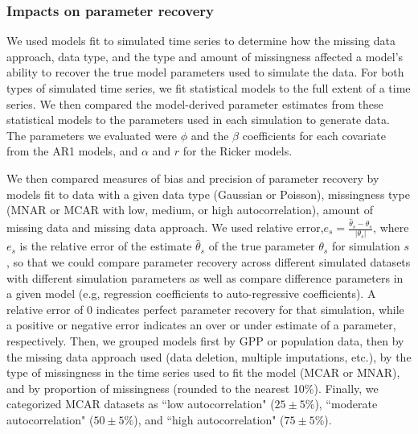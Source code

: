 \documentclass{article}
\begin{document}
\begin{linenumbers}
\subsubsection*{Impacts on parameter recovery}
We used models fit to simulated time series to determine how the missing data approach, data type, and the type and amount of missingness affected a model's ability to recover the true model parameters used to simulate the data. For both types of simulated time series, we fit statistical models to the full extent of a time series. We then compared the model-derived parameter estimates from these statistical models to the parameters used in each simulation to generate data. The parameters we evaluated were $\phi$ and the $\beta$ coefficients for each covariate from the AR1 models, and $\alpha$ and $r$ for the Ricker models.

We then compared measures of bias and precision of parameter recovery by models fit to data with a given data type (Gaussian or Poisson), missingness type (MNAR or MCAR with low, medium, or high autocorrelation), amount of missing data and missing data approach. We used relative error,$e_s = \frac{\hat{\theta}_s - \theta_s}{|\theta_s|}$, where $e_s$ is the relative error of the estimate $\hat \theta_s$ of the true parameter $\theta_s$ for simulation $s$, so that we could compare parameter recovery across different simulated datasets with different simulation parameters as well as compare difference parameters in a given model (e.g, regression coefficients to auto-regressive coefficients). A relative error of 0 indicates perfect parameter recovery for that simulation, while a positive or negative error indicates an over or under estimate of a parameter, respectively. Then, we grouped models first by GPP or population data, then by the missing data approach used (data deletion, multiple imputations, etc.), by the type of missingness in the time series used to fit the model (MCAR or MNAR), and by proportion of missingness (rounded to the nearest 10\%). Finally, we categorized MCAR datasets as ``low autocorrelation" ($25 \pm 5\%$), ``moderate autocorrelation" ($50 \pm 5\%$), and ``high autocorrelation" ($75 \pm 5\%$).


\end{linenumbers}
\end{document}

